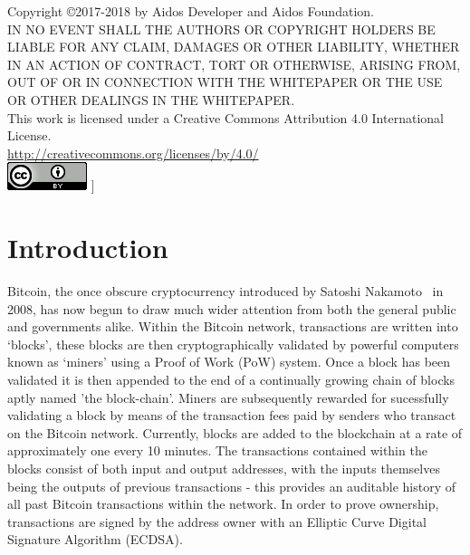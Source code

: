 \documentclass[a4paper,10pt,twocolumn]{article}
\begin{document}
Copyright \copyright 2017-2018 by Aidos Developer and Aidos Foundation. \\

IN NO EVENT SHALL THE AUTHORS OR COPYRIGHT HOLDERS BE LIABLE FOR ANY CLAIM, DAMAGES OR OTHER
LIABILITY, WHETHER IN AN ACTION OF CONTRACT, TORT OR OTHERWISE, ARISING FROM,
OUT OF OR IN CONNECTION WITH THE WHITEPAPER OR THE USE OR OTHER DEALINGS IN
THE WHITEPAPER. \\

This work is licensed under a Creative Commons Attribution 4.0 International License. \\
\url{http://creativecommons.org/licenses/by/4.0/} \\
\includegraphics{cc}
]

\twocolumn[
\tableofcontents
]

\clearpage

\section{Introduction}
Bitcoin, the once obscure cryptocurrency introduced by Satoshi Nakamoto~\cite{btc} in 2008, has now begun to draw much wider attention 
from both the general public and governments alike. Within the Bitcoin network, transactions are written into `blocks', these blocks are 
then cryptographically validated by powerful computers known as `miners' using a Proof of Work (PoW) system. Once a block has been 
validated it is then appended to the end of a continually growing chain of blocks aptly named 'the block-chain'. Miners are subsequently
rewarded for sucessfully validating a block by means of the transaction fees paid by senders who transact on the Bitcoin network.
Currently, blocks are added to the blockchain at a rate of approximately one every 10 minutes. The transactions contained within the
blocks consist of both input and output addresses, with the inputs themselves being the outputs of previous transactions - this provides
an auditable history of all past Bitcoin transactions within the network. In order to prove ownership, transactions are signed by the 
address owner with an Elliptic Curve Digital Signature Algorithm (ECDSA).
\end{document}
